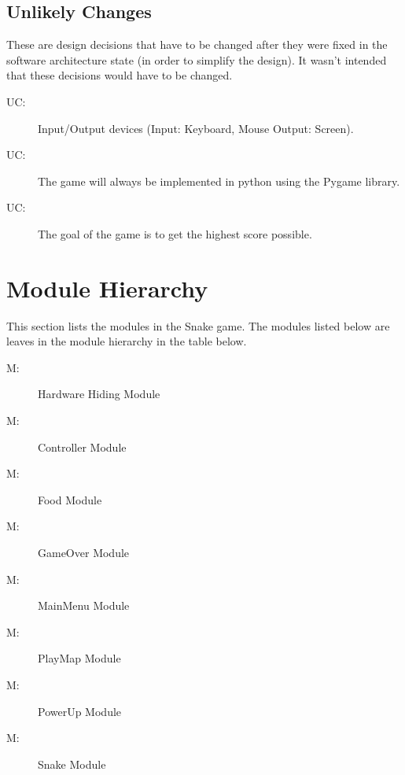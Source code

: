 \documentclass[12pt]{article}
\newcounter{ucnum}
\newcommand{\uctheucnum}{UC\theucnum}
\newcounter{mnum}
\newcommand{\mthemnum}{M\themnum}
\begin{document}
\subsection{Unlikely Changes} \label{SecUchange}

These are design decisions that have to be changed after they were fixed in the software architecture state (in order to simplify the design). It wasn't intended that these decisions would have to be changed.

\begin{description}
\item[ \uctheucnum \label{ucIO}:] Input/Output devices
  (Input: Keyboard, Mouse Output: Screen).
\item[ \uctheucnum \label{ucPygame}:] The game will always be implemented in python using the Pygame library.
\item[ \uctheucnum \label{ucGoal}:] The goal of the game is to get the highest score possible.
\end{description}

\section{Module Hierarchy} \label{SecMH}

This section lists the modules in the Snake game. The modules listed below are leaves in the module hierarchy in the table below. 

\begin{description}
\item [ \mthemnum \label{mHardware}:] Hardware Hiding Module\
\item [ \mthemnum \label{mController}:] Controller Module
\item [ \mthemnum \label{mFood}:] Food Module
\item [ \mthemnum \label{mGameOver}:] GameOver Module
\item [ \mthemnum \label{mMainMenu}:] MainMenu Module
\item [ \mthemnum \label{mPlayMap}:] PlayMap Module
\item [ \mthemnum \label{mPowerUp}:] PowerUp Module
\item [\refstepcounter{mnum} \mthemnum \label{mSnake}:] Snake Module
\end{description}
\end{document}
